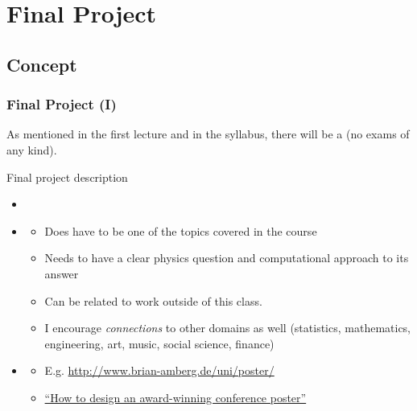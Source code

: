 \documentclass[hyperref={colorlinks=true}]{beamer}
\begin{document}
\section[Final Project]{Final Project}

\subsection[Concept]{Concept}

\begin{frame}%
  \frametitle{Final Project (I)}

  As mentioned in the first lecture and in the syllabus, there will be a  (no exams of any kind).
  
  \vspace{0.3cm}
  
  \begin{ucblock}{Final project  description}
    \begin{itemize}
      \item {}
      \item {}
      \begin{itemize}
        \item Does  have to be one of the topics covered in the course
        \item Needs to have a clear physics question and computational approach to its answer
        \item Can be related to work outside of this class. 
        \item I encourage \textit{connections} to other domains as well (statistics, mathematics, engineering, art, music, social science, finance)
      \end{itemize}
      \item {}
      \begin{itemize}
        \item E.g. \url{http://www.brian-amberg.de/uni/poster/}
        \item \href{http://blogs.lse.ac.uk/impactofsocialsciences/2018/05/11/how-to-design-an-award-winning-conference-poster/}{``How to design an award-winning conference poster''}
      \end{itemize}
    \end{itemize}
  \end{ucblock}

  
\end{frame}
\end{document}

